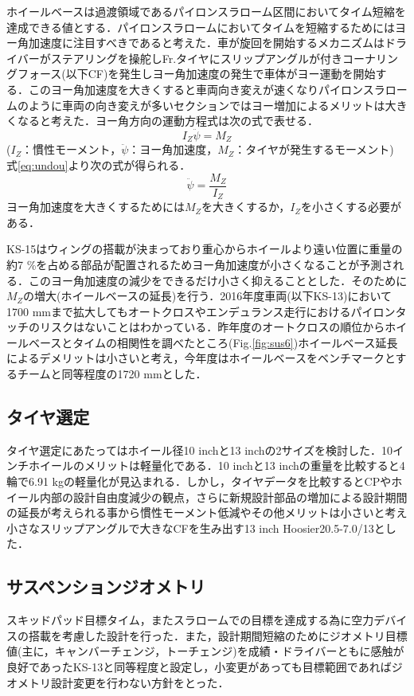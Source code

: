 ホイールベースは過渡領域であるパイロンスラローム区間においてタイム短縮を達成できる値とする．パイロンスラロームにおいてタイムを短縮するためにはヨー角加速度に注目すべきであると考えた．車が旋回を開始するメカニズムはドライバーがステアリングを操舵しFr.タイヤにスリップアングルが付きコーナリングフォース(以下CF)を発生しヨー角加速度の発生で車体がヨー運動を開始する．このヨー角加速度を大きくすると車両向き変えが速くなりパイロンスラロームのように車両の向き変えが多いセクションではヨー増加によるメリットは大きくなると考えた．ヨー角方向の運動方程式は次の式で表せる．
\begin{equation}
  \label{eq:undou}
  I_Z \ddot{\psi} = M_Z
\end{equation}
($I_Z$：慣性モーメント，$\ddot{\psi}$：ヨー角加速度，$M_Z$：タイヤが発生するモーメント)\\
式\ref{eq:undou}より次の式が得られる．
\begin{equation}
  \ddot{\psi} = \frac{M_Z}{I_Z}
\end{equation}
ヨー角加速度を大きくするためには$M_Z$を大きくするか，$I_Z$を小さくする必要がある．

KS-15はウィングの搭載が決まっており重心からホイールより遠い位置に重量の約7 \%を占める部品が配置されるためヨー角加速度が小さくなることが予測される．このヨー角加速度の減少をできるだけ小さく抑えることとした．そのために$M_Z$の増大(ホイールベースの延長)を行う．2016年度車両(以下KS-13)において1700 mmまで拡大してもオートクロスやエンデュランス走行におけるパイロンタッチのリスクはないことはわかっている．昨年度のオートクロスの順位からホイールベースとタイムの相関性を調べたところ(Fig.\ref{fig:sus6})ホイールベース延長によるデメリットは小さいと考え，今年度はホイールベースをベンチマークとするチームと同等程度の1720 mmとした．

\subsection{タイヤ選定}
タイヤ選定にあたってはホイール径10 inchと13 inchの2サイズを検討した．10インチホイールのメリットは軽量化である．10 inchと13 inchの重量を比較すると4輪で6.91 kgの軽量化が見込まれる．しかし，タイヤデータを比較するとCPやホイール内部の設計自由度減少の観点，さらに新規設計部品の増加による設計期間の延長が考えられる事から慣性モーメント低減やその他メリットは小さいと考え小さなスリップアングルで大きなCFを生み出す13 inch Hoosier20.5-7.0/13とした．

\subsection{サスペンションジオメトリ}
スキッドパッド目標タイム，またスラロームでの目標を達成する為に空力デバイスの搭載を考慮した設計を行った．また，設計期間短縮のためにジオメトリ目標値(主に，キャンバーチェンジ，トーチェンジ)を成績・ドライバーともに感触が良好であったKS-13と同等程度と設定し，小変更があっても目標範囲であればジオメトリ設計変更を行わない方針をとった．

